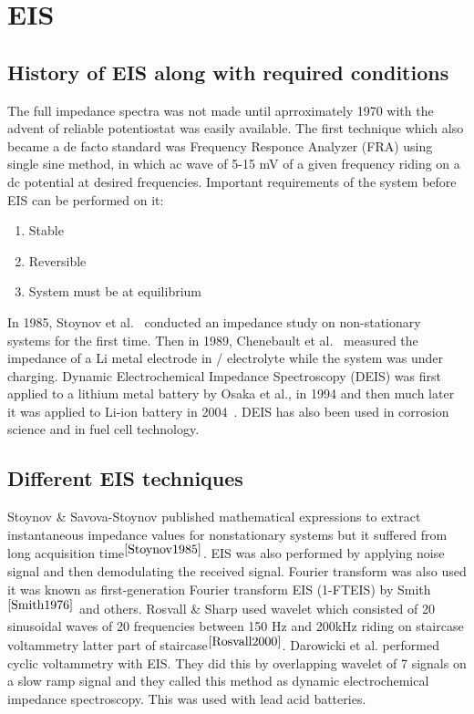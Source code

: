 \documentclass[Notes.tex]{subfiles}
\begin{document}
	
	
\chapter{EIS}

\section{History of EIS along with required conditions}
The full impedance spectra was not made until aprroximately 1970 with the advent of reliable potentiostat was easily available. The first technique which also became a de facto standard was Frequency Responce Analyzer (FRA) using single sine method, in which ac wave of 5-15 mV of a given frequency riding on a dc potential at desired frequencies. Important requirements of the system before EIS can be performed on it:
\begin{enumerate}
	\item Stable
	\item Reversible 
	\item System must be at equilibrium
\end{enumerate}
In 1985, Stoynov et al.~\cite{Stoynov1985} conducted an impedance study on non-stationary systems for the first time. Then in 1989, Chenebault et al.~\cite{Chenebault1989} measured the impedance of a Li metal electrode in / electrolyte while the system was under charging. Dynamic Electrochemical Impedance Spectroscopy (DEIS) was first applied to a lithium metal battery by Osaka et al., in 1994 and then much later it was applied to Li-ion battery in 2004~\cite{Itagaki2004,Itagaki2005}. DEIS has also been used in corrosion science and in fuel cell technology.
\section{Different EIS techniques}Stoynov \& Savova-Stoynov published mathematical expressions to extract instantaneous impedance values for nonstationary systems but it suffered from long acquisition time$^{\cite{Stoynov1985}}$.
EIS was also performed by applying noise signal and then demodulating the received signal. Fourier transform was also used it was known as first-generation Fourier transform EIS (1-FTEIS) by Smith$^{\cite{Smith1976}}$ and others. Rosvall \& Sharp used wavelet which consisted of 20 sinusoidal waves of 20 frequencies between 150 Hz and 200kHz riding on staircase voltammetry latter part of staircase$^{\cite{Rosvall2000}}$. Darowicki et al. performed cyclic voltammetry with EIS. They did this by overlapping wavelet of 7 signals on a slow ramp signal and they called this method as dynamic electrochemical impedance spectroscopy. This was used with lead acid batteries. 
\end{document}
